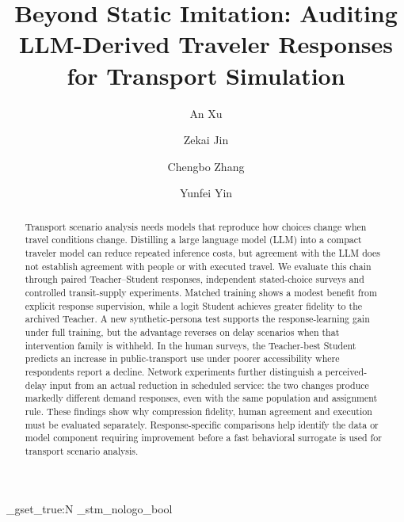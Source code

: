 \documentclass[a4paper,fleqn]{cas-sc}
\begin{document}
\ExplSyntaxOn
\bool_gset_true:N \g_stm_nologo_bool
\ExplSyntaxOff
\let\printorcid\relax
\let\WriteBookmarks\relax
\def\floatpagepagefraction{1}
\def\textpagefraction{.001}
\setcounter{topnumber}{4}
\setcounter{bottomnumber}{4}
\setcounter{totalnumber}{10}
\renewcommand{\topfraction}{0.95}
\renewcommand{\bottomfraction}{0.95}
\renewcommand{\textfraction}{0.05}
\renewcommand{\floatpagefraction}{0.9}


\title [mode = title]{Beyond Static Imitation: Auditing LLM-Derived Traveler Responses for Transport Simulation}

\author[1]{An Xu}

\author[2]{Zekai Jin}

\author[2]{Chengbo Zhang}


\author[1]{Yunfei Yin}
\cormark[1]

\address[1]{School of Transportation Science and Engineering, Harbin Institute of Technology, Harbin 150090, China}
\address[2]{Department of Civil Engineering, McGill University, Montreal, QC H3A 0C3, Canada}


\begin{abstract}
Transport scenario analysis needs models that reproduce how choices change when travel conditions change. Distilling a large language model (LLM) into a compact traveler model can reduce repeated inference costs, but agreement with the LLM does not establish agreement with people or with executed travel. We evaluate this chain through paired Teacher--Student responses, independent stated-choice surveys and controlled transit-supply experiments. Matched training shows a modest benefit from explicit response supervision, while a logit Student achieves greater fidelity to the archived Teacher. A new synthetic-persona test supports the response-learning gain under full training, but the advantage reverses on delay scenarios when that intervention family is withheld. In the human surveys, the Teacher-best Student predicts an increase in public-transport use under poorer accessibility where respondents report a decline. Network experiments further distinguish a perceived-delay input from an actual reduction in scheduled service: the two changes produce markedly different demand responses, even with the same population and assignment rule. These findings show why compression fidelity, human agreement and execution must be evaluated separately. Response-specific comparisons help identify the data or model component requiring improvement before a fast behavioral surrogate is used for transport scenario analysis.
\end{abstract}
\end{document}
